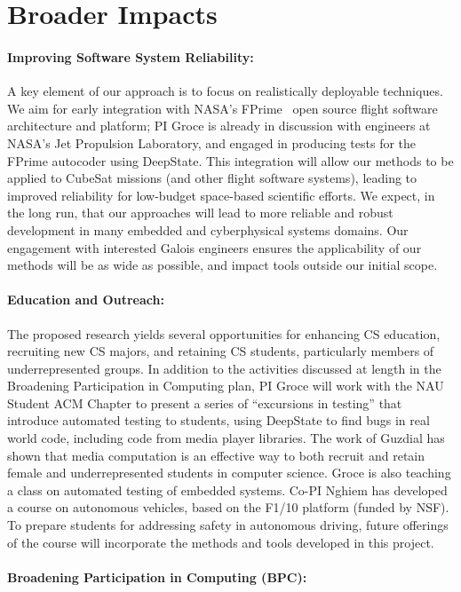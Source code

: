 \section{Broader Impacts}

\paragraph{Improving Software System Reliability:} A key element of
our approach is to focus on realistically deployable techniques.  We aim
for early integration with NASA's FPrime~\cite{fprime,fprimerepo}
open source
flight software architecture and platform; PI Groce is already in
discussion with engineers at NASA's Jet Propulsion Laboratory, and
engaged in producing tests for the FPrime autocoder using DeepState.
This integration will allow our
methods to be applied to CubeSat missions (and other flight software
systems), leading to improved reliability for low-budget space-based
scientific efforts.  We expect, in the long run, that our approaches
will lead to more reliable and robust development in many embedded and
cyberphysical systems domains.  Our engagement with interested Galois
engineers ensures the applicability of our methods will be as wide as
possible, and impact tools outside our initial scope.

\paragraph{Education and Outreach:}
The proposed research yields several opportunities for enhancing CS
education, recruiting new CS majors, and retaining CS students,
particularly members of underrepresented groups.  In addition to the
activities discussed at length in the Broadening Participation in
Computing plan, PI Groce will work with the NAU Student ACM Chapter to
present a series of ``excursions in testing'' that introduce automated
testing to students, using DeepState to find bugs in real world code,
including code from media player libraries.  The
work of Guzdial \cite{Guzdial} has shown that media computation is an effective way to both recruit and retain female and
underrepresented students in computer science. Groce is also teaching
a class on automated testing of embedded systems.  Co-PI Nghiem has
developed a course on  autonomous vehicles, based on the F1/10 platform (funded by
NSF). 
To prepare students for addressing safety in autonomous driving, future offerings of the course will incorporate the methods and tools developed in this project.


\paragraph{Broadening Participation in Computing (BPC):}


